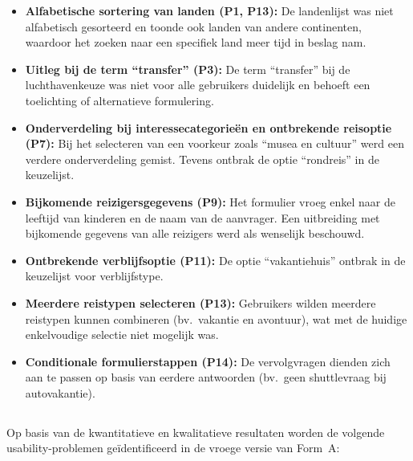 \begin{itemize}
  \item \textbf{Alfabetische sortering van landen (P1, P13):} De landenlijst was niet alfabetisch gesorteerd en toonde ook landen van andere continenten, waardoor het zoeken naar een specifiek land meer tijd in beslag nam.
  \item \textbf{Uitleg bij de term ``transfer'' (P3):} De term ``transfer'' bij de luchthavenkeuze was niet voor alle gebruikers duidelijk en behoeft een toelichting of alternatieve formulering.
  \item \textbf{Onderverdeling bij interessecategorieën en ontbrekende reisoptie (P7):} Bij het selecteren van een voorkeur zoals ``musea en cultuur'' werd een verdere onderverdeling gemist. Tevens ontbrak de optie ``rondreis'' in de keuzelijst.
  \item \textbf{Bijkomende reizigersgegevens (P9):} Het formulier vroeg enkel naar de leeftijd van kinderen en de naam van de aanvrager. Een uitbreiding met bijkomende gegevens van alle reizigers werd als wenselijk beschouwd.
  \item \textbf{Ontbrekende verblijfsoptie (P11):} De optie ``vakantiehuis'' ontbrak in de keuzelijst voor verblijfstype.
  \item \textbf{Meerdere reistypen selecteren (P13):} Gebruikers wilden meerdere reistypen kunnen combineren (bv.\ vakantie en avontuur), wat met de huidige enkelvoudige selectie niet mogelijk was.
  \item \textbf{Conditionale formulierstappen (P14):} De vervolgvragen dienden zich aan te passen op basis van eerdere antwoorden (bv.\ geen shuttlevraag bij autovakantie).
\end{itemize}

\subsection{}

Op basis van de kwantitatieve en kwalitatieve resultaten worden de volgende usability-problemen geïdentificeerd in de vroege versie van Form~A:

